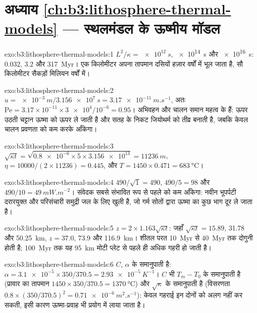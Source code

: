 \section*{अध्याय \ref{ch:b3:lithosphere-thermal-models} --- स्थलमंडल के ऊष्मीय मॉडल}

\begin{solution}{exo:b3:lithosphere-thermal-models:1}
$L^2/\kappa = \qty{e12}{s}$, \qty{e14}{s} और \qty{e16}{s}: 0.032, 3.2 और
\qty{317}{Myr}। एक किलोमीटर अपना तापमान दसियों हज़ार
वर्षों में भूल जाता है, सौ किलोमीटर सैकड़ों मिलियन वर्षों में।
\end{solution}

\begin{solution}{exo:b3:lithosphere-thermal-models:2}
$u = \qty{e-3}{m}/\qty{3.156e7}{s} = \qty{3.17e-11}{m.s^{-1}}$, अतः
$\mathrm{Pe} = 3.17\times10^{-11}\times\num{3e4}/10^{-6} = 0.95$। अभिवहन और
चालन समान महत्व के हैं: ऊपर उठती चट्टान ऊष्मा को ऊपर ले जाती है
और सतह के निकट जियोथर्म को तीव्र बनाती है, जबकि केवल चालन प्रवणता को
कम करके आँकेगा।
\end{solution}

\begin{solution}{exo:b3:lithosphere-thermal-models:3}
$\sqrt{\kappa t} = \sqrt{\num{0.8e-6}\times5\times\num{3.156e13}} =
\qty{11236}{m}$, $\eta = 10000/(2\times11236) = 0.445$, और $T = 1450\times0.471
= \qty{683}{\celsius}$।
\end{solution}

\begin{solution}{exo:b3:lithosphere-thermal-models:4}
$490/\sqrt1 = 490$, $490/5 = 98$ और $490/10 = \qty{49}{mW.m^{-2}}$। संवेदक
सबसे संभावित रूप से पहले को कम आँकेगा: नवीन भूपर्पटी दरारयुक्त और
परिसंचारी समुद्री जल के लिए खुली है, जो गर्म सोतों द्वारा ऊष्मा का कुछ भाग दूर ले जाता है।
\end{solution}

\begin{solution}{exo:b3:lithosphere-thermal-models:5}
$z = 2\times1.163\sqrt{\kappa t}$: जहाँ $\sqrt{\kappa t} = 15.89$, 31.78 और
\qty{50.25}{km}, $z = 37.0$, 73.9 और \qty{116.9}{km}। शीतल परत
\qty{10}{Myr} से \qty{40}{Myr} तक दोगुनी होती है; \qty{100}{Myr} तक यह
\qty{95}{km} मोटी प्लेट से पहले ही अधिक गहरी हो जाती है।
\end{solution}

\begin{solution}{exo:b3:lithosphere-thermal-models:6}
$C$, $\alpha$ के समानुपाती है: $\alpha = \num{3.1e-5}\times350/370.5 =
\qty{2.93e-5}{K^{-1}}$। $C$ भी $T_m - T_0$ के समानुपाती है (प्रावार का तापमान
$1450\times350/370.5 = \qty{1370}{\celsius}$) और $\sqrt\kappa$ के
समानुपाती है (विसरणता $0.8\times(350/370.5)^2 = \qty{0.71e-6}{m^2.s^{-1}}$): केवल गहराई
इन दोनों को अलग नहीं कर सकती, इसी कारण ऊष्मा-प्रवाह भी प्रयोग में लाया जाता है।
\end{solution}


